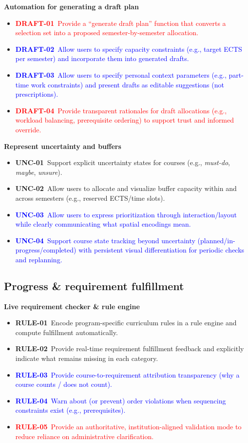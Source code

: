 \textbf{Automation for generating a draft plan}
\begin{itemize}
  \item \textcolor{red}{\textbf{DRAFT-01}~Provide a “generate draft plan” function that converts a selection set into a proposed semester-by-semester allocation.}
  \item \textcolor{blue}{\textbf{DRAFT-02}~Allow users to specify capacity constraints (e.g., target ECTS per semester) and incorporate them into generated drafts.}
  \item \textcolor{blue}{\textbf{DRAFT-03}~Allow users to specify personal context parameters (e.g., part-time work constraints) and present drafts as editable suggestions (not prescriptions).}
  \item \textcolor{red}{\textbf{DRAFT-04}~Provide transparent rationales for draft allocations (e.g., workload balancing, prerequisite ordering) to support trust and informed override.}
\end{itemize}

\textbf{Represent uncertainty and buffers}
\begin{itemize}
  \item \textbf{UNC-01}~Support explicit uncertainty states for courses (e.g., \emph{must-do}, \emph{maybe}, \emph{unsure}).
  \item \textbf{UNC-02}~Allow users to allocate and visualize buffer capacity within and across semesters (e.g., reserved ECTS/time slots).
  \item \textcolor{blue}{\textbf{UNC-03}~Allow users to express prioritization through interaction/layout while clearly communicating what spatial encodings mean.}
  \item \textcolor{blue}{\textbf{UNC-04}~Support course state tracking beyond uncertainty (planned/in-progress/completed) with persistent visual differentiation for periodic checks and replanning.}
\end{itemize}


\subsection*{Progress \& requirement fulfillment}

\textbf{Live requirement checker \& rule engine}
\begin{itemize}
  \item \textbf{RULE-01}~Encode program-specific curriculum rules in a rule engine and compute fulfillment automatically.
  \item \textbf{RULE-02}~Provide real-time requirement fulfillment feedback and explicitly indicate what remains missing in each category.
  \item \textcolor{blue}{\textbf{RULE-03}~Provide course-to-requirement attribution transparency (why a course counts / does not count).}
  \item \textcolor{blue}{\textbf{RULE-04}~Warn about (or prevent) order violations when sequencing constraints exist (e.g., prerequisites).}
  \item \textcolor{red}{\textbf{RULE-05}~Provide an authoritative, institution-aligned validation mode to reduce reliance on administrative clarification.}
\end{itemize}

